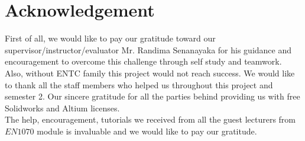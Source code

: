 {\let\clearpage\relax \chapter{Acknowledgement}

}
First of all, we would like to pay our gratitude toward our supervisor/instructor/evaluator Mr. Randima Senanayaka for his guidance and encouragement to overcome this challenge through self study and teamwork. Also, without ENTC family this project would not reach success. We would like to thank all the staff members who helped us throughout this project and semester 2. Our sincere gratitude for all the parties behind providing us with free Solidworks and Altium licenses.\\
The help, encouragement, tutorials we received from all the guest lecturers from $EN1070$ module is invaluable and we would like to pay our gratitude.
